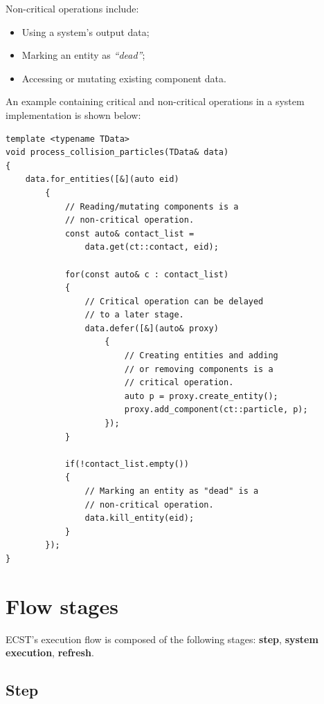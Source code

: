 \documentclass[twoside, 12pt, a4paper, openany]{book}
\begin{document}
Non-critical operations include:

\begin{itemize}
\item
  Using a system's output data;
\item
  Marking an entity as \emph{``dead''};
\item
  Accessing or mutating existing component data.
\end{itemize}

An example containing critical and non-critical operations in a system
implementation is shown below:

\begin{verbatim}
template <typename TData>
void process_collision_particles(TData& data)
{
    data.for_entities([&](auto eid)
        {
            // Reading/mutating components is a
            // non-critical operation.
            const auto& contact_list =
                data.get(ct::contact, eid);

            for(const auto& c : contact_list)
            {
                // Critical operation can be delayed
                // to a later stage.
                data.defer([&](auto& proxy)
                    {
                        // Creating entities and adding
                        // or removing components is a
                        // critical operation.
                        auto p = proxy.create_entity();
                        proxy.add_component(ct::particle, p);
                    });
            }

            if(!contact_list.empty())
            {
                // Marking an entity as "dead" is a
                // non-critical operation.
                data.kill_entity(eid);
            }
        });
}
\end{verbatim}

\section{Flow stages}\label{flow-stages}

ECST's execution flow is composed of the following stages:
\textbf{step}, \textbf{system execution}, \textbf{refresh}.

\hypertarget{step_stage}{\subsection{Step}\label{step_stage}}
\end{document}
